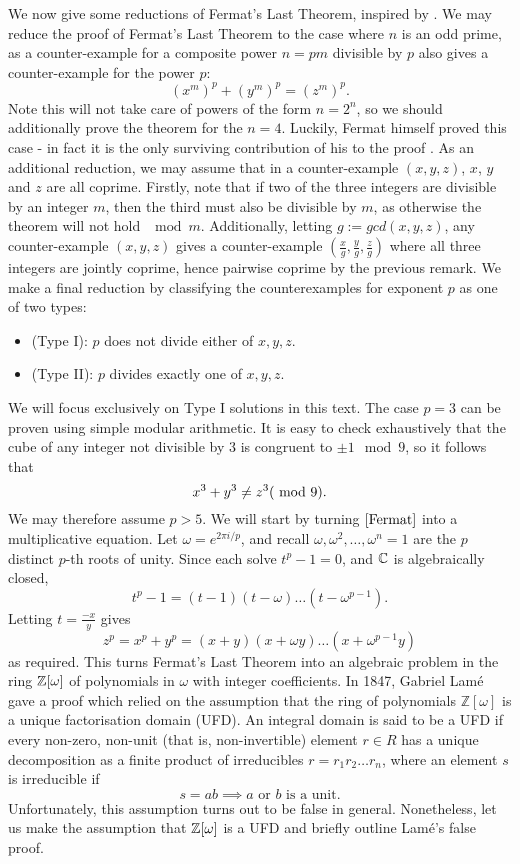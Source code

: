 We now give some reductions of Fermat's Last Theorem, inspired by \cite{Wright}. We may reduce the proof of Fermat's Last Theorem to the case where $n$ is an odd prime, as a counter-example for a composite power $n=pm$ divisible by $p$ also gives a counter-example for the power $p$:
$$(x^m)^p+(y^m)^p=(z^m)^p.$$
Note this will not take care of powers of the form $n=2^n$, so we should additionally prove the theorem for the $n=4$. Luckily, Fermat himself proved this case - in fact it is the only surviving contribution of his to the proof \cite{Fermat-4}. As an additional reduction, we may assume that in a counter-example $(x,y,z)$, $x$, $y$ and $z$ are all coprime. Firstly, note that if two of the three integers are divisible by an integer $m$, then the third must also be divisible by $m$, as otherwise the theorem will not hold $\mod m$. Additionally, letting $g:=gcd(x,y,z)$, any counter-example $(x,y,z)$ gives a counter-example $(\frac{x}{g},\frac{y}{g},\frac{z}{g})$ where all three integers are jointly coprime, hence pairwise coprime by the previous remark. We make a final reduction by classifying the counterexamples for exponent $p$ as one of two types:
\begin{itemize}
    \item (Type I): $p$ does not divide either of $x,y,z$.
    \item (Type II): $p$ divides exactly one of $x,y,z$.
\end{itemize}
We will focus exclusively on Type I solutions in this text. The case $p=3$ can be proven using simple modular arithmetic. It is easy to check exhaustively that the cube of any integer not divisible by $3$ is congruent to $\pm 1\mod 9$, so it follows that $$x^3+y^3\neq z^3 (\ \mathrm{mod}\ 9).$$
We may therefore assume $p>5$. We will start by turning $\cref{Fermat}$ into a multiplicative equation. Let $\omega=e^{2\pi i/p}$, and recall $\omega,\omega^2,\dots,\omega^n=1$ are the $p$ distinct $p$-th roots of unity. Since each solve $t^p-1=0$, and $\mathbb{C}$ is algebraically closed,
\begin{equation}\label{eq-omega-polynomial}t^p-1=(t-1)(t-\omega)\dots (t-\omega^{p-1}).\end{equation}
Letting $t=\frac{-x}{y}$ gives 
\begin{equation}\label{eq-fermat-as-mult}
z^p=x^p+y^p=(x+y)(x+\omega y)\dots (x+\omega^{p-1}y)\end{equation}
as required. This turns Fermat's Last Theorem into an algebraic problem in the ring $\mathbb{Z}[\omega]$ of polynomials in $\omega$ with integer coefficients. In 1847, Gabriel Lamé gave a proof which relied on the assumption that the ring of polynomials $\mathbb{Z}[\omega]$ is a unique factorisation domain (UFD). An integral domain is said to be a UFD if every non-zero, non-unit (that is, non-invertible) element $r\in R$ has a unique decomposition as a finite product of irreducibles $r=r_1r_2\dots r_n$, where an element $s$ is irreducible if $$s=ab\implies a\text{ or } b \text{ is a unit.}$$ Unfortunately, this assumption turns out to be false in general. Nonetheless, let us make the assumption that $\mathbb{Z}[\omega]$ is a UFD and briefly outline Lamé's false proof.

